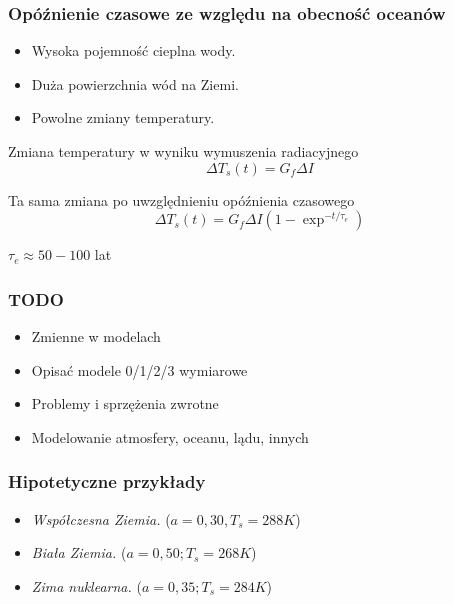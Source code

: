 \documentclass{beamer}
\begin{document}
\begin{frame}
	\frametitle{Opóźnienie czasowe ze względu na obecność oceanów}
	
	\begin{itemize}
		\item Wysoka pojemność cieplna wody.
		
		\item Duża powierzchnia wód na Ziemi.
		
		\item Powolne zmiany temperatury.
	
	\end{itemize}
	
	\begin{block}{Zmiana temperatury w wyniku wymuszenia radiacyjnego}
		\[\Delta T_s(t) = G_f\Delta I
		\]
	\end{block}
	
	\begin{block}{Ta sama zmiana po uwzględnieniu opóźnienia czasowego}
		\[\Delta T_s(t) = G_f\Delta I(1-\exp^{-t/\tau _e})
		\]
	\end{block}
	
	$\tau _e \approx 50-100$ lat
	
\end{frame}







\begin{frame}
	\frametitle{TODO}
	\begin{itemize}
		\item Zmienne w modelach
		\item Opisać modele 0/1/2/3 wymiarowe
		\item Problemy i sprzężenia zwrotne
		\item Modelowanie atmosfery, oceanu, lądu, innych
	\end{itemize}
\end{frame}



\begin{frame}
	\frametitle{Hipotetyczne przykłady}
	\begin{itemize}
		\item \textit{Współczesna Ziemia.} ($a=0,30, T_s=288K$)
		\item \textit{Biała Ziemia.} ($a = 0,50;T_s=268K$)
		\item \textit{Zima nuklearna.} ($a=0,35; T_s=284K$)
	\end{itemize}
	
\end{frame}
\end{document}
